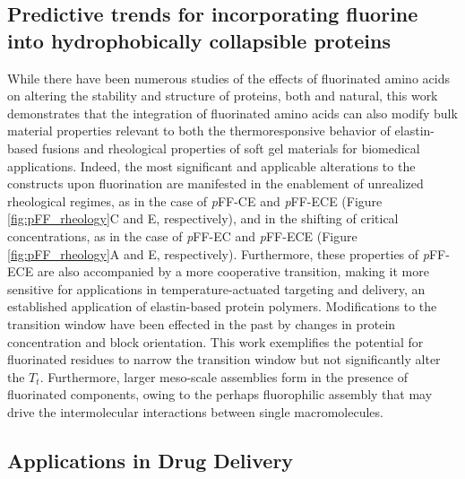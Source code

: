 \begin{refsection}
\subsection{Predictive trends for incorporating fluorine into hydrophobically
collapsible proteins}
\label{sec:predictive_trends}
While there have been numerous studies of the effects of fluorinated amino acids
on altering the stability and structure of proteins, both  and
natural,\cite{Megeed2002,Meyer2002,Wright2002,Simnick2007,Baker2011,URRY1974,Urry1985}
this work demonstrates that the integration of fluorinated amino acids can also
modify bulk material properties relevant to both the thermoresponsive behavior
of elastin-based fusions and rheological properties of soft gel materials for
biomedical applications. Indeed, the most significant and applicable alterations
to the constructs upon fluorination are manifested in the enablement of unrealized
rheological regimes, as in the case of \emph{p}FF-CE and \emph{p}FF-ECE (Figure
\ref{fig:pFF_rheology}C and E, respectively), and in the shifting of critical
concentrations, as in the case of \emph{p}FF-EC and \emph{p}FF-ECE (Figure
\ref{fig:pFF_rheology}A and E, respectively). Furthermore, these properties of
\emph{p}FF-ECE are also accompanied by a more cooperative transition, making it more
sensitive for applications in temperature-actuated targeting and delivery, an
established application of elastin-based protein
polymers.\cite{Simnick2007,Chilkoti2002a} Modifications to the transition window
have been effected in the past by changes in protein concentration and block
orientation.\cite{Yamaoka2003,Meyer2002} This work exemplifies the potential for
fluorinated residues to narrow the transition window but not significantly alter
the ${T_t}$. Furthermore, larger meso-scale assemblies form in the presence of
fluorinated components, owing to the perhaps fluorophilic assembly that may
drive the intermolecular interactions between single macromolecules.

\subsection{Applications in Drug Delivery}
\label{sec:pff_app_drug}


\end{refsection}
